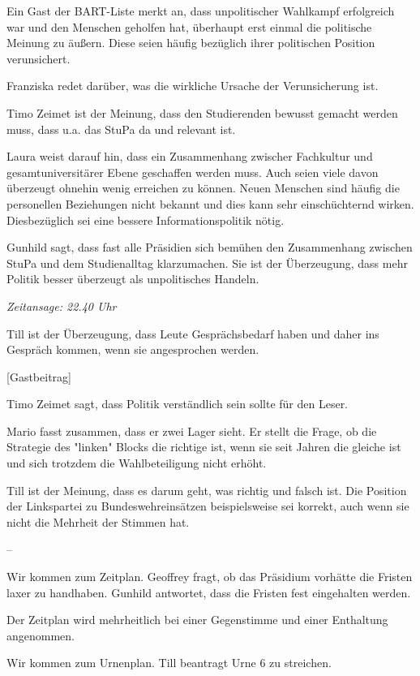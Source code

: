 \documentclass[ngerman,headheight=70pt]{scrartcl}
\begin{document}
    Ein Gast der BART-Liste merkt an, dass unpolitischer Wahlkampf erfolgreich war
    und den Menschen geholfen hat, überhaupt erst einmal die politische Meinung
    zu äußern. Diese seien häufig bezüglich ihrer politischen Position verunsichert.

    Franziska redet darüber, was die wirkliche Ursache der Verunsicherung ist.

    Timo Zeimet ist der Meinung, dass den Studierenden bewusst gemacht werden muss,
    dass u.a. das StuPa da und relevant ist.

    Laura weist darauf hin, dass ein Zusammenhang zwischer Fachkultur und
    gesamtuniversitärer Ebene geschaffen werden muss. Auch seien viele davon überzeugt
    ohnehin wenig erreichen zu können. Neuen Menschen sind häufig die personellen
    Beziehungen nicht bekannt und dies kann sehr einschüchternd wirken.
    Diesbezüglich sei eine bessere Informationspolitik nötig.

    Gunhild sagt, dass fast alle Präsidien sich bemühen den Zusammenhang zwischen
    StuPa und dem Studienalltag klarzumachen. Sie ist der Überzeugung, dass
    mehr Politik besser überzeugt als unpolitisches Handeln.

    \textit{Zeitansage: 22.40 Uhr}

    Till ist der Überzeugung, dass Leute Gesprächsbedarf haben und daher ins
    Gespräch kommen, wenn sie angesprochen werden.

    [Gastbeitrag]

    Timo Zeimet sagt, dass Politik verständlich sein sollte für den Leser.

    Mario fasst zusammen, dass er zwei Lager sieht. Er stellt die Frage, ob
    die Strategie des "linken" Blocks die richtige ist, wenn sie seit Jahren die
    gleiche ist und sich trotzdem die Wahlbeteiligung nicht erhöht.

    Till ist der Meinung, dass es darum geht, was richtig und falsch ist. Die Position
    der Linkspartei zu Bundeswehreinsätzen beispielsweise sei korrekt, auch wenn
    sie nicht die Mehrheit der Stimmen hat.

    --

    Wir kommen zum Zeitplan. Geoffrey fragt, ob das Präsidium vorhätte die Fristen
    laxer zu handhaben. Gunhild antwortet, dass die Fristen fest eingehalten werden.

    Der Zeitplan wird mehrheitlich bei einer Gegenstimme und einer Enthaltung
    angenommen.

    Wir kommen zum Urnenplan. Till beantragt Urne 6 zu streichen.
\end{document}
